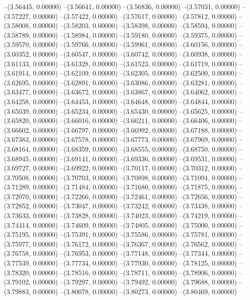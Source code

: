 --(3.56445, 0.00000)
--(3.56641, 0.00000)
--(3.56836, 0.00000)
--(3.57031, 0.00000)
--(3.57227, 0.00000)
--(3.57422, 0.00000)
--(3.57617, 0.00000)
--(3.57812, 0.00000)
--(3.58008, 0.00000)
--(3.58203, 0.00000)
--(3.58398, 0.00000)
--(3.58594, 0.00000)
--(3.58789, 0.00000)
--(3.58984, 0.00000)
--(3.59180, 0.00000)
--(3.59375, 0.00000)
--(3.59570, 0.00000)
--(3.59766, 0.00000)
--(3.59961, 0.00000)
--(3.60156, 0.00000)
--(3.60352, 0.00000)
--(3.60547, 0.00000)
--(3.60742, 0.00000)
--(3.60938, 0.00000)
--(3.61133, 0.00000)
--(3.61328, 0.00000)
--(3.61523, 0.00000)
--(3.61719, 0.00000)
--(3.61914, 0.00000)
--(3.62109, 0.00000)
--(3.62305, 0.00000)
--(3.62500, 0.00000)
--(3.62695, 0.00000)
--(3.62891, 0.00000)
--(3.63086, 0.00000)
--(3.63281, 0.00000)
--(3.63477, 0.00000)
--(3.63672, 0.00000)
--(3.63867, 0.00000)
--(3.64062, 0.00000)
--(3.64258, 0.00000)
--(3.64453, 0.00000)
--(3.64648, 0.00000)
--(3.64844, 0.00000)
--(3.65039, 0.00000)
--(3.65234, 0.00000)
--(3.65430, 0.00000)
--(3.65625, 0.00000)
--(3.65820, 0.00000)
--(3.66016, 0.00000)
--(3.66211, 0.00000)
--(3.66406, 0.00000)
--(3.66602, 0.00000)
--(3.66797, 0.00000)
--(3.66992, 0.00000)
--(3.67188, 0.00000)
--(3.67383, 0.00000)
--(3.67578, 0.00000)
--(3.67773, 0.00000)
--(3.67969, 0.00000)
--(3.68164, 0.00000)
--(3.68359, 0.00000)
--(3.68555, 0.00000)
--(3.68750, 0.00000)
--(3.68945, 0.00000)
--(3.69141, 0.00000)
--(3.69336, 0.00000)
--(3.69531, 0.00000)
--(3.69727, 0.00000)
--(3.69922, 0.00000)
--(3.70117, 0.00000)
--(3.70312, 0.00000)
--(3.70508, 0.00000)
--(3.70703, 0.00000)
--(3.70898, 0.00000)
--(3.71094, 0.00000)
--(3.71289, 0.00000)
--(3.71484, 0.00000)
--(3.71680, 0.00000)
--(3.71875, 0.00000)
--(3.72070, 0.00000)
--(3.72266, 0.00000)
--(3.72461, 0.00000)
--(3.72656, 0.00000)
--(3.72852, 0.00000)
--(3.73047, 0.00000)
--(3.73242, 0.00000)
--(3.73438, 0.00000)
--(3.73633, 0.00000)
--(3.73828, 0.00000)
--(3.74023, 0.00000)
--(3.74219, 0.00000)
--(3.74414, 0.00000)
--(3.74609, 0.00000)
--(3.74805, 0.00000)
--(3.75000, 0.00000)
--(3.75195, 0.00000)
--(3.75391, 0.00000)
--(3.75586, 0.00000)
--(3.75781, 0.00000)
--(3.75977, 0.00000)
--(3.76172, 0.00000)
--(3.76367, 0.00000)
--(3.76562, 0.00000)
--(3.76758, 0.00000)
--(3.76953, 0.00000)
--(3.77148, 0.00000)
--(3.77344, 0.00000)
--(3.77539, 0.00000)
--(3.77734, 0.00000)
--(3.77930, 0.00000)
--(3.78125, 0.00000)
--(3.78320, 0.00000)
--(3.78516, 0.00000)
--(3.78711, 0.00000)
--(3.78906, 0.00000)
--(3.79102, 0.00000)
--(3.79297, 0.00000)
--(3.79492, 0.00000)
--(3.79688, 0.00000)
--(3.79883, 0.00000)
--(3.80078, 0.00000)
--(3.80273, 0.00000)
--(3.80469, 0.00000)
